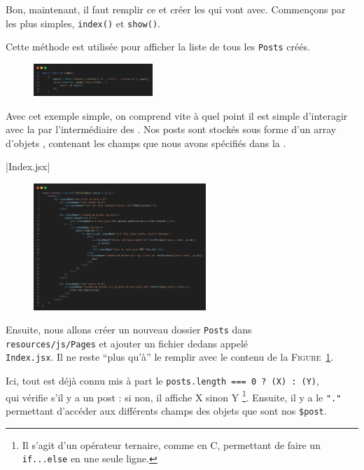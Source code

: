Bon, maintenant, il faut remplir ce \controller{} et créer les \views{} qui vont avec. Commençons par les plus simples, \verb|index()| et \verb|show()|.

Cette méthode est utilisée pour afficher la liste de tous les \texttt{Posts} créés. 

\begin{figure}
    \includegraphics[width=0.4\textwidth]{figures-C1/postscontroller_index.png}
\end{figure}
Avec cet exemple simple, on comprend vite à quel point il est simple d'interagir avec la \db{} par l'intermédiaire des \models{}. Nos posts sont stockés sous forme d'un array d'objets \php{}, contenant les champs que nous avons spécifiés dans la \migration{}. 

|Index.jsx|
\begin{figure}
    \vspace{-0.5cm}
    \includegraphics[width=0.581\textwidth]{figures-C1/posts_index.png}
    \caption{\protect{}\label{fig:post_index}}
\end{figure}
Ensuite, nous allons créer un nouveau dossier \verb|Posts| dans  \\ \verb|resources/js/Pages| et ajouter un fichier dedans appelé \\ \verb|Index.jsx|. Il ne reste ``plus qu'à'' le remplir avec le contenu de la \textsc{Figure~\ref{fig:post_index}}.

Ici, tout est déjà connu mis à part le \verb|posts.length === 0 ? (X) : (Y)|,  \\ qui vérifie s'il y a un post : si non, il affiche X sinon Y \footnote{Il s'agit d'un opérateur ternaire, comme en C, permettant de faire un \texttt{if...else} en une seule ligne.}. Ensuite, il y a le \verb|"."| permettant d'accéder aux différents champs des objets que sont nos \verb|$post|.


